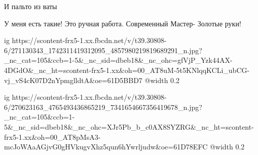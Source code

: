  
 
 
 
 


И пальто из ваты


У меня есть такие! Это ручная работа. Современный Мастер- Золотые руки!


\ifcmt
  ig https://scontent-frx5-1.xx.fbcdn.net/v/t39.30808-6/271130343_1742311419312095_4857980219819689291_n.jpg?_nc_cat=105&ccb=1-5&_nc_sid=dbeb18&_nc_ohc=gfVjP_Yzk44AX-4DGdO&_nc_ht=scontent-frx5-1.xx&oh=00_AT8uM-5t5KNlqqKCLi_ubCG-vj_vS4cK07D2nYpmglldtA&oe=61D5BBD7
  @width 0.2
\fi


\ifcmt
  ig https://scontent-frx5-1.xx.fbcdn.net/v/t39.30808-6/270623163_4765493436865219_7341654667356419678_n.jpg?_nc_cat=105&ccb=1-5&_nc_sid=dbeb18&_nc_ohc=XJr5Pb_b_c0AX8SYZRG&_nc_ht=scontent-frx5-1.xx&oh=00_AT8pMsA3-mcJoWAaAGjvG0gHVkugvXhz5qun6hYwrljudw&oe=61D78EFC
  @width 0.2
\fi
